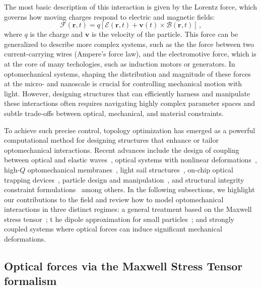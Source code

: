 The most basic description of this interaction is given by the Lorentz force, which governs how moving charges respond to electric and magnetic fields:
\begin{equation}
    \mathbf{\bm{\mathcal{F}}}(\mathbf{r},t) = q \left[ \bm{\mathcal{E}}(\mathbf{r},t) + \mathbf{v}(t) \times \bm{\mathcal{B}}(\mathbf{r},t) \right]\,,
\end{equation}
where $q$ is the charge and $\mathbf{v}$ is the velocity of the particle. This force can be generalized to describe more complex systems,
such as the the force between two current-carrying 
wires (Ampere's force law), and the electromotive force, which is at the core of many techologies, such as induction motors or generators.
In optomechanical systems, shaping the distribution and magnitude of these forces at the micro- and nanoscale is crucial for controlling mechanical motion with light. 
However, designing structures that can efficiently harness and manipulate these interactions often requires navigating highly complex
 parameter spaces and subtle trade-offs between optical, mechanical, and material constraints.

To achieve such precise control, topology optimization has emerged as a powerful computational method for designing structures that enhance or tailor optomechanical interactions.
Recent advances include the design of coupling between optical and elastic
 waves~\cite{photo_topopt}, optical systems with nonlinear deformations~\cite{def_wg}, high-$Q$ optomechanical membranes~\cite{highQ1, fengwen, aragon1},
light sail structures~\cite{lightsail_topopt, lightsail_topopt1},
on-chip optical trapping devices~\cite{ownpub1}, particle design and manipulation~\cite{ownpub2, particle_opt},
and structural integrity constraint formulations~\cite{structural_integrity}
 among others.
 In the following subsections, we highlight our contributions to the field and review how to model optomechanical interactions in three distinct regimes: a general treatment based on the Maxwell stress tensor~\cite{ownpub2}; t
 he dipole approximation for small particles~\cite{ownpub1, ownpub3}; and strongly coupled systems where optical forces can induce significant mechanical deformations.
\subsection*{Optical forces via the Maxwell Stress Tensor formalism~\cite{ownpub3}}

